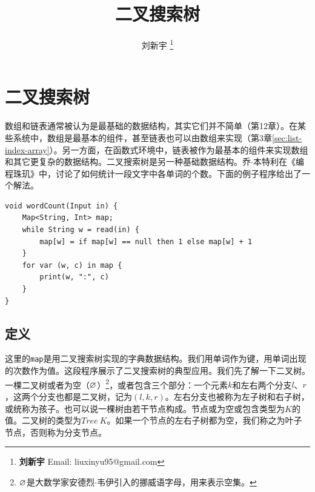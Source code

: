 \documentclass[b5paper]{ctexart}
\begin{document}
\title{二叉搜索树}

\author{刘新宇
\thanks{{\bfseries 刘新宇} \newline
  Email: liuxinyu95@gmail.com \newline}
  }

\maketitle
\fi


\ifx\wholebook\relax
\chapter{二叉搜索树}
\fi

数组和链表通常被认为是最基础的数据结构，其实它们并不简单（第12章）。在某些系统中，数组是最基本的组件，甚至链表也可以由数组来实现（第3章\autoref{sec:list-index-array}）。另一方面，在函数式环境中，链表被作为最基本的组件来实现数组和其它更复杂的数据结构。二叉搜索树是另一种基础数据结构。乔$\cdot$本特利在《编程珠玑》\cite{Bentley}中，讨论了如何统计一段文字中各单词的个数。下面的例子程序给出了一个解法。

\lstset{frame=single}
\begin{lstlisting}[language=Bourbaki]
void wordCount(Input in) {
    Map<String, Int> map;
    while String w = read(in) {
        map[w] = if map[w] == null then 1 else map[w] + 1
    }
    for var (w, c) in map {
        print(w, ":", c)
    }
}
\end{lstlisting}



\section{定义}
\label{introduction} 

这里的\texttt{map}是用二叉搜索树实现的字典数据结构。我们用单词作为键，用单词出现的次数作为值。这段程序展示了二叉搜索树的典型应用。我们先了解一下二叉树。一棵二叉树或者为空（$\varnothing$）\footnote{$\varnothing$是大数学家安德烈$\cdot$韦伊引入的挪威语字母，用来表示空集。}，或者包含三个部分：一个元素$k$和左右两个分支$l$、$r$，这两个分支也都是二叉树，记为$(l, k, r)$。左右分支也被称为左子树和右子树，或统称为孩子。也可以说一棵树由若干节点构成。节点或为空或包含类型为$K$的值。二叉树的类型为$Tree\ K$。如果一个节点的左右子树都为空，我们称之为叶子节点，否则称为分支节点。
\end{document}

